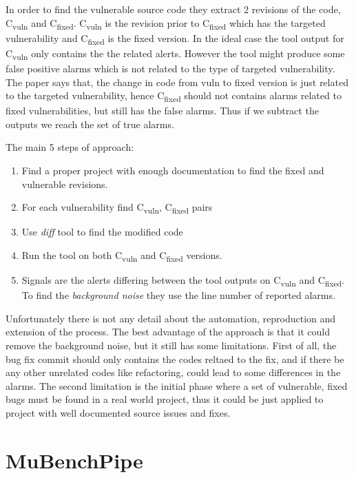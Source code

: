 \documentclass[authoryear,preprint]{sigplanconf}
\begin{document}
In order to find the vulnerable source code they extract 2 revisions of the code, C\textsubscript{vuln} and C\textsubscript{fixed}. C\textsubscript{vuln} is the revision prior to C\textsubscript{fixed} which has the targeted vulnerability and C\textsubscript{fixed} is the fixed version. In the ideal case the tool output for C\textsubscript{vuln} only contains the the related alerts. However the tool might produce some false positive alarms which is not related to the type of targeted vulnerability. The paper says that, the change in code from vuln to fixed version is just related to the targeted vulnerability, hence C\textsubscript{fixed} should not contains alarms related to fixed vulnerabilities, but still has the false alarms. Thus if we subtract the outputs we reach the set of true alarms. 

The main 5 steps of approach: 
\begin{enumerate}
	\item Find a proper project with enough documentation to find the fixed and vulnerable revisions. 
	\item For each vulnerability find  C\textsubscript{vuln},  C\textsubscript{fixed} pairs
	\item Use \textit{diff} tool to find the modified code
	\item Run the tool on both C\textsubscript{vuln} and C\textsubscript{fixed} versions.
	\item Signals are the alerts differing between the tool outputs on C\textsubscript{vuln} and C\textsubscript{fixed}. To find the \textit{background noise} they use the line number of reported alarms. 
\end{enumerate}

Unfortunately there is not any detail about the automation, reproduction and extension of the process. The best advantage of the approach is that it could remove the background noise, but it still has some limitations. First of all, the bug fix commit should only contains the codes reltaed to the fix, and if there be any other unrelated codes like refactoring, could lead to some differences in the alarms. The second limitation is the initial phase where a set of vulnerable, fixed bugs must be found in a real world project, thus it could be just applied to project with well documented source issues and fixes.

\section{MuBenchPipe}
\label{sec:sec_mubenchpipe}
\end{document}

